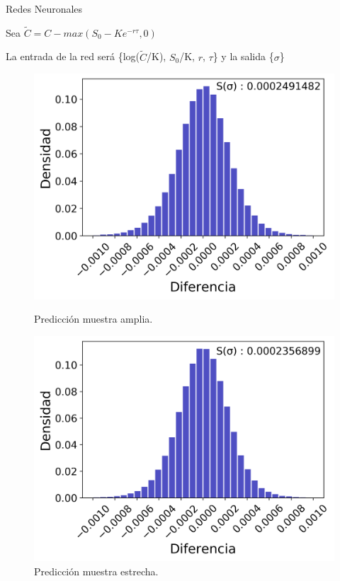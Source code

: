 \documentclass{beamer}
\begin{document}
\begin{frame}{Redes Neuronales}
    
    Sea $\tilde{C} = C - max(S_0 - Ke^{-r\tau}, 0) $

    La entrada de la red ser\'a \{log($\tilde{C}$/K), $S_0$/K, $r$, $\tau$\} y la salida \{$\sigma$\}

    \begin{figure}[!tbp]
      \centering
      \begin{minipage}[b]{0.45\textwidth}
        \includegraphics[width=\textwidth]{Predic_w_log_mil.png}
        \caption{Predicci\'on muestra amplia.}
      \end{minipage}
      \hfill
      \begin{minipage}[b]{0.45\textwidth}
        \includegraphics[width=\textwidth]{Predic_n_log_mil.png}
        \caption{Predicci\'on muestra estrecha.}
      \end{minipage}
    \end{figure}

\end{frame}
\end{document}
